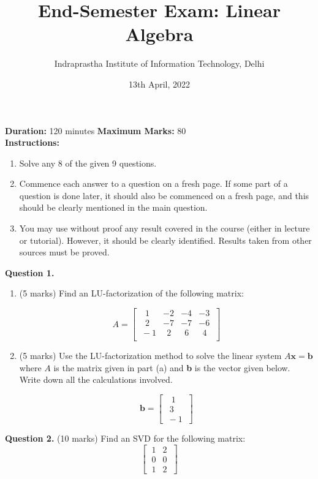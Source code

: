 \documentclass{article}
\title{End-Semester Exam: Linear Algebra}
\author{Indraprastha Institute of Information Technology, Delhi}
\date{13th April, 2022}
\begin{document}

\maketitle

\textbf{Duration:} 120 minutes \hfill \textbf{Maximum Marks:} 80 \\[5mm]

\textbf{Instructions:}
\begin{enumerate}
    \item Solve any 8 of the given 9 questions.
    \item Commence each answer to a question on a fresh page. If some part of a question is done later, it should also be commenced on a fresh page, and this should be clearly mentioned in the main question.
    \item You may use without proof any result covered in the course (either in lecture or tutorial). However, it should be clearly identified. Results taken from other sources must be proved. \\
\end{enumerate}


\textbf{Question 1.}
\begin{enumerate}[label=(\alph*), leftmargin=6.25mm]
    \item (5 marks)
    Find an LU-factorization of the following matrix:

    $$A = \begin{bmatrix}
        \ \ \ 1 & -2 & -4 & -3 \ \\
        \ \ \ 2 & -7 & -7 & -6 \ \\
        \ -1 & \ \ 2 & \ \ 6 & \ \ 4 \ \\
    \end{bmatrix}$$

    \item (5 marks)
    Use the LU-factorization method to solve the linear system $A \textbf{x} = \textbf{b}$ where $A$ is the matrix given in part (a) and \textbf{b} is the vector given below.
    Write down all the calculations involved.

    $$\textbf{b} = \begin{bmatrix} \ \ \ 1 \\ \ \ 3 \\ \ -1 \ \end{bmatrix}$$
\end{enumerate}


\textbf{Question 2.} (10 marks)
Find an SVD for the following matrix:
$$ \begin{bmatrix} \ 1 & 2 \ \\ \ 0 & 0 \ \\ \ 1 & 2 \ \end{bmatrix}$$
\end{document}
